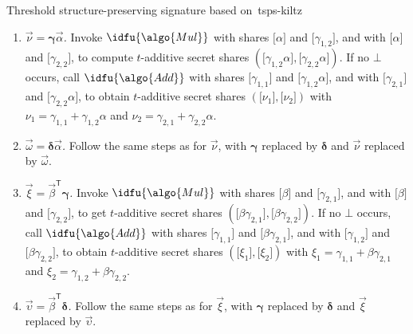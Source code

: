 \begin{protocolbox}{Threshold structure-preserving signature based
  on~\cite{C:KilPanWee15}}{tsps-kiltz}
\begin{description}
\begin{enumerate}
        \item \emph{$\vec{\nu} = \boldsymbol{\gamma}\vec{\alpha}$.} Invoke
          $\idfu{\algo{Mul}}$ with shares $\lbrack \alpha\rbrack $ and $\lbrack
          \gamma_{1, 2}\rbrack $, and with $\lbrack \alpha\rbrack $ and
          $\lbrack \gamma_{2, 2}\rbrack $, to compute $t$-additive secret
          shares $(\lbrack \gamma_{1, 2}\alpha\rbrack ,\lbrack
          \gamma_{2,2}\alpha \rbrack )$. If no $\bot$ occurs, call
          $\idfu{\algo{Add}}$ with shares $\lbrack \gamma_{1, 1}\rbrack $ and
          $\lbrack \gamma_{1, 2}\alpha \rbrack $, and with $\lbrack \gamma_{2,
          1}\rbrack $ and $\lbrack \gamma_{2, 2}\alpha\rbrack $, to obtain
          $t$-additive secret shares $(\lbrack \nu_1\rbrack , \lbrack
          \nu_2\rbrack )$ with $\nu_1 = \gamma_{1, 1}+ \gamma_{1, 2}\alpha$ and
          $\nu_2 = \gamma_{2, 1}+ \gamma_{2, 2}\alpha$.

        \item \emph{$\vec{\omega} = \boldsymbol{\delta}\vec{\alpha}$.} Follow
          the same steps as for $\vec{\nu}$, with $\boldsymbol{\gamma}$
          replaced by $\boldsymbol{\delta}$ and $\vec{\nu}$ replaced by
          $\vec{\omega}$.

        \item \emph{$\vec{\xi} = \vec{\beta}^{\mathsf{T}}\boldsymbol{\gamma}$.}
          Invoke $\idfu{\algo{Mul}}$ with shares $\lbrack \beta\rbrack $ and
          $\lbrack \gamma_{2, 1}\rbrack $, and with $\lbrack \beta\rbrack $ and
          $\lbrack \gamma_{2, 2}\rbrack $, to get $t$-additive secret shares
          $(\lbrack \beta\gamma_{2, 1}\rbrack ,\lbrack \beta\gamma_{2,2}
          \rbrack )$. If no $\bot$ occurs, call $\idfu{\algo{Add}}$ with shares
          $\lbrack \gamma_{1, 1}\rbrack $ and $\lbrack \beta\gamma_{2, 1}
          \rbrack $, and with $\lbrack \gamma_{1, 2}\rbrack $ and $\lbrack
          \beta\gamma_{2, 2}\rbrack $, to obtain $t$-additive secret shares
          $(\lbrack \xi_1\rbrack , \lbrack \xi_2\rbrack )$ with $\xi_1 =
          \gamma_{1, 1}+ \beta\gamma_{2, 1}$ and $\xi_2 = \gamma_{1, 2}+
          \beta\gamma_{2, 2}$.

        \item \emph{$\vec{\upsilon} =
          \vec{\beta}^{\mathsf{T}}\boldsymbol{\delta}$.} Follow the same steps
          as for $\vec{\xi}$, with $\boldsymbol{\gamma}$ replaced by
          $\boldsymbol{\delta}$ and $\vec{\xi}$ replaced by $\vec{\upsilon}$.


\end{enumerate}
\end{description}
\end{protocolbox}
